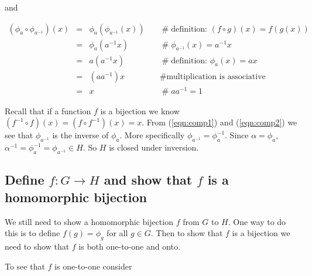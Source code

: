 \documentclass{article}
\theoremstyle{definition}
\begin{document}
\bigskip
\noindent
and  

\bigskip
\begin{equation}
\begin{array}{rcll}
(\phi_{a} \circ \phi_{a^{-1}})(x)
&=& \phi_{a}(\phi_{a^{-1}}(x))      &\quad  \mathrel{\#} \text{definition: $(f \circ g)(x) = f(g(x))$}  \\
&=& \phi_{a}(a^{-1}x)                   &\quad  \mathrel{\#} \phi_{a^{-1}}(x) = a^{-1}x                          \\
&=& a(a^{-1}x)                             &\quad  \mathrel{\#} \text{definition: }  \phi_{a}(x) = ax             \\
&=& (a a^{-1})x                            &\quad  \mathrel{\#} \text{multiplication is associative}             \\
&=& x                                           &\quad  \mathrel{\#} aa^{-1} = 1
\end{array}
\label{eqn:comp2}
\end{equation}

\bigskip
\noindent
Recall that if a function $f$ is a bijection we know $(f^{-1} \circ f)(x) = (f \circ f^{-1})(x) = x$.  From (\ref{eqn:comp1}) 
and  (\ref{eqn:comp2}) we see that  $\phi_{a^{-1}}$ is the inverse of $\phi_a$. More specifically $\phi_{a^{-1}} = \phi^{-1}_{a}$.
Since $\alpha = \phi_a$,  $\alpha^{-1} = \phi^{-1}_a = \phi_{a^{-1}}  \in H$. So $H$ is closed under inversion.



\subsection{Define $f:G \rightarrow H$ and show that $f$ is a homomorphic bijection}
We still need to show a homomorphic bijection $f$ from $G$ to $H$. One way to do this is to define $f(g) = \phi_{g}$ for all $g \in G$. 
Then to show that $f$ is a bijection we need to show that $f$ is both  one-to-one and onto.

\bigskip
\noindent
To see that $f$ is one-to-one consider
\end{document}
